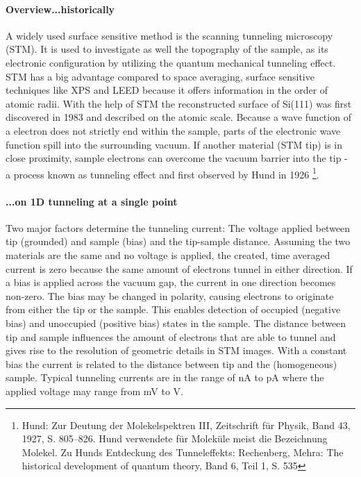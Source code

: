 \paragraph{Overview...historically}
A widely used surface sensitive method is the scanning tunneling microscopy (STM).  It is used to investigate as well the topography of the sample, as its electronic configuration by utilizing the quantum mechanical tunneling effect. STM has a big advantage compared to space averaging, surface sensitive techniques like XPS and LEED because it offers information in the order of atomic radii. With the help of STM the reconstructed surface of Si(111) was first discovered \cite{binnig_1983} in 1983 and described on the atomic scale. Because a wave function of a electron does not strictly end within the sample, parts of the electronic wave function spill into the surrounding vacuum. If another material (STM tip) is in close proximity, sample electrons can overcome the vacuum barrier into the tip - a process known as tunneling effect and first observed by Hund in 1926 \footnote{Hund: Zur Deutung der Molekelspektren III, Zeitschrift für Physik, Band 43, 1927, S. 805–826. Hund verwendete für Moleküle meist die Bezeichnung Molekel. Zu Hunds Entdeckung des Tunneleffekts: Rechenberg, Mehra: The historical development of quantum theory, Band 6, Teil 1, S. 535}. 

\paragraph{...on 1D tunneling at a single point}
Two major factors determine the tunneling current: The voltage applied between tip (grounded) and sample (bias) and the tip-sample distance. Assuming the two materials are the same and no voltage is applied, the created, time averaged current is zero because the same amount of electrons tunnel in either direction. If a bias is applied across the vacuum gap, the current in one direction becomes non-zero. The bias may be changed in polarity, causing electrons to originate from either the tip or the sample. This enables detection of occupied (negative bias) and unoccupied (positive bias) states in the sample. The distance between tip and sample influences the amount of electrons that are able to tunnel and gives rise to the resolution of geometric details in STM images. With a constant bias the current is related to the distance between tip and the (homogeneous) sample. Typical tunneling currents are in the range of nA to pA where the applied voltage may range from mV to V.

